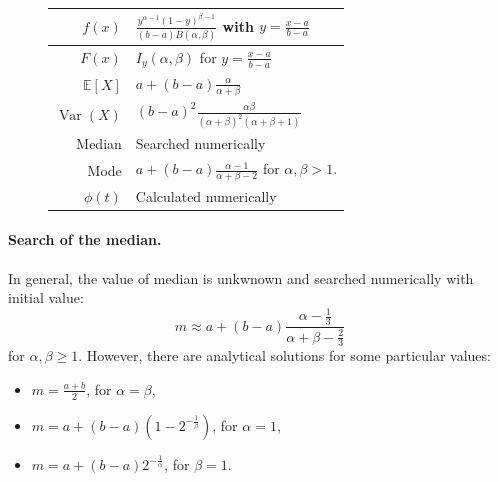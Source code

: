\documentclass[a4paper,11pt]{article}
\theoremstyle{plain}
\theoremstyle{definition}
\newcommand{\ME}{\mathbb{E}}
\newcommand{\Var}{\operatorname{Var}}
\begin{document}
\begin{figure}[!htb]
\begin{minipage}{0.4\textwidth}
\begin{tabular}{| r | l |}
			\hline
			$f(x)$ & $\frac{y^{\alpha - 1}(1 - y)^{\beta - 1}}{(b-a)B(\alpha, \beta)}$ with $y = \frac{x - a}{b - a}$ \\
			\hline
			$F(x)$ & $I_{y}(\alpha, \beta)$ for $y = \frac{x - a}{b - a}$\\
			\hline
			$\ME[X]$ & $a + (b-a)\frac{\alpha}{\alpha + \beta}$ \\
			\hline
			$\Var(X)$ & $(b-a)^2\frac{ \alpha \beta}{(\alpha + \beta)^2 (\alpha + \beta + 1)}$ \\
			\hline
			Median & Searched numerically \\
			\hline
			Mode & $a + (b-a)\frac{\alpha - 1}{\alpha + \beta - 2}$ for $\alpha, \beta > 1$. \\
			\hline
			$\phi(t)$ & Calculated numerically \\
			\hline
		\end{tabular}
	\end{minipage}
	\end{figure}
	
	\paragraph{Search of the median.}
	In general, the value of median is unkwnown and searched numerically with initial value:
	\[
	m \approx a + (b-a)\frac{\alpha - \frac{1}{3} }{ \alpha + \beta - \frac{2}{3} }
	\]
	for $\alpha, \beta \geq 1$.	However, there are analytical solutions for some particular values:
	\begin{itemize}
		\item $m = \frac{a + b}{2}$, for $\alpha = \beta$,
		\item $m = a + (b-a)(1 - 2^{-\frac{1}{\beta}})$, for $\alpha = 1$,
		\item $m = a+(b-a)2^{-\frac{1}{\alpha}}$, for $\beta = 1$.
	\end{itemize}
	
\end{document}
